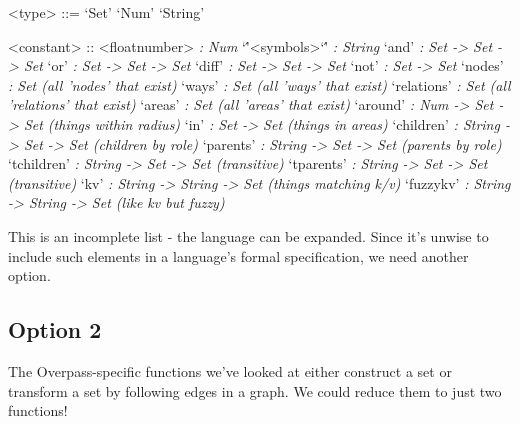 \documentclass[12pt]{extarticle}
\begin{document}
\begin{grammar}
<type> ::= `Set'
\alt `Num'
\alt `String'

<constant>
    ::   <floatnumber> \hspace*{\fill}\textit {: Num}
    \alt `\''<symbols>`\'' \hspace*{\fill}\textit {: String}
    \alt `and'  \hspace*{\fill}\textit {: Set -> Set -> Set}
    \alt `or'   \hspace*{\fill}\textit {: Set -> Set -> Set}
    \alt `diff' \hspace*{\fill}\textit {: Set -> Set -> Set}
    \alt `not'  \hspace*{\fill}\textit {: Set -> Set}
    \alt `nodes' \hspace*{\fill}\textit {: Set (all 'nodes' that exist)}
    \alt `ways' \hspace*{\fill}\textit {: Set (all 'ways' that exist)}
    \alt `relations' \hspace*{\fill}\textit {: Set (all 'relations' that exist)}
    \alt `areas' \hspace*{\fill}\textit {: Set (all 'areas' that exist)}
    \alt `around' \hspace*{\fill}\textit {: Num -> Set -> Set (things within radius)}
    \alt `in'   \hspace*{\fill}\textit {: Set -> Set (things in areas)}
    \alt `children'   \hspace*{\fill}\textit {: String -> Set -> Set (children by role)}
    \alt `parents'   \hspace*{\fill}\textit {: String -> Set -> Set (parents by role)}
    \alt `tchildren'   \hspace*{\fill}\textit {: String -> Set -> Set (transitive)}
    \alt `tparents'   \hspace*{\fill}\textit {: String -> Set -> Set (transitive)}
    \alt `kv'      \hspace*{\fill}\textit {: String -> String -> Set (things matching k/v)}
    \alt `fuzzykv'      \hspace*{\fill}\textit {: String -> String -> Set (like kv but fuzzy)}
\end{grammar}

This is an incomplete list - the language can be expanded. Since it's unwise to
include such elements in a language's formal specification, we need another option.

\pagebreak
\subsection{Option 2}
The Overpass-specific functions we've looked at either construct a set or
transform a set by following edges in a graph. We could reduce them to just
two functions!
\end{document}
